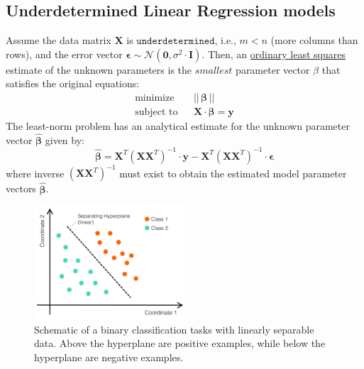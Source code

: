 \documentclass{article}[11pt]
\begin{document}
\subsection{Underdetermined Linear Regression models}
Assume the data matrix $\mathbf{X}$ is $\texttt{underdetermined}$, i.e., $m < n$ (more columns than rows), and 
the error vector $\mathbf{\epsilon}\sim\mathcal{N}(\mathbf{0},\sigma^{2}\cdot\mathbf{I})$.
Then, an \href{https://en.wikipedia.org/wiki/Ordinary_least_squares}{ordinary least squares} estimate of the unknown parameters is the $\textit{smallest}$ parameter vector $\beta$ that satisfies the original equations:
\begin{eqnarray*}
\text{minimize}~& & ||\,\mathbf{\beta}\,|| \\
\text{subject to} & & \mathbf{X}\cdot\mathbf{\beta} = \mathbf{y}
\end{eqnarray*}
The least-norm problem has an analytical estimate for the unknown parameter vector $\hat{\mathbf{\beta}}$ given by:
\begin{equation*}
\hat{\mathbf{\beta}} =\mathbf{X}^{T}\left(\mathbf{X}\mathbf{X}^{T}\right)^{-1}\cdot\mathbf{y} - \mathbf{X}^{T}\left(\mathbf{X}\mathbf{X}^{T}\right)^{-1}\cdot\mathbf{\epsilon}
\end{equation*}
where inverse $\left(\mathbf{X}\mathbf{X}^{T}\right)^{-1}$ must exist to obtain the estimated model parameter vectors $\hat{\mathbf{\beta}}$.

\begin{figure}
    \centering
	\includegraphics[width=0.5\textwidth]{./figs/Fig-LinearSeperableData-Hyperplane.pdf}
	\caption{Schematic of a binary classification tasks with linearly separable data.
    Above the hyperplane are positive examples, while below the hyperplane are negative examples.}\label{fig:linearhyperplane}
\end{figure}
\end{document}
